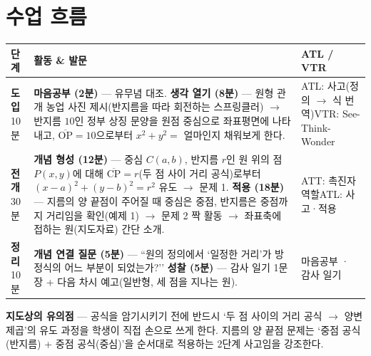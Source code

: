 \documentclass[11pt,a4paper]{article}
\begin{document}
\section{수업 흐름}
\begin{tabularx}{\linewidth}{@{}>{\centering\arraybackslash}p{1.6cm}X>{\raggedright\arraybackslash\small}p{3.1cm}@{}}
\toprule
\textbf{단계} & \textbf{활동 \& 발문} & \textbf{ATL / VTR} \\
\midrule
\textcolor{goldstrong}{\textbf{도입}}\newline\footnotesize 10분 &
\textbf{마음공부 (2분)} --- 유무념 대조.\newline
\textbf{생각 열기 (8분)} --- 원형 관개 농업 사진 제시(반지름을 따라 회전하는 스프링클러) $\to$ 반지름 $10$인 정부 상징 문양을 원점 중심으로 좌표평면에 나타내고, $\overline{\text{OP}}=10$으로부터 $x^2+y^2=$ 얼마인지 채워보게 한다. &
ATL: 사고(정의 $\to$ 식 번역)\newline VTR: See-Think-Wonder \\
\addlinespace
\textcolor{goldstrong}{\textbf{전개}}\newline\footnotesize 30분 &
\textbf{개념 형성 (12분)} --- 중심 $C(a,b)$, 반지름 $r$인 원 위의 점 $P(x,y)$에 대해 $\overline{\text{CP}}=r$(두 점 사이 거리 공식)로부터 $(x-a)^2+(y-b)^2=r^2$ 유도 $\to$ 문제 1.\newline
\textbf{적용 (18분)} --- 지름의 양 끝점이 주어질 때 중심은 중점, 반지름은 중점까지 거리임을 확인(예제 1) $\to$ 문제 2 짝 활동 $\to$ 좌표축에 접하는 원(지도자료) 간단 소개. &
ATT: 촉진자 역할\newline ATL: 사고·적용 \\
\addlinespace
\textcolor{goldstrong}{\textbf{정리}}\newline\footnotesize 10분 &
\textbf{개념 연결 질문 (5분)} --- ``원의 정의에서 `일정한 거리'가 방정식의 어느 부분이 되었는가?''\newline
\textbf{성찰 (5분)} --- 감사 일기 1문장 + 다음 차시 예고(일반형, 세 점을 지나는 원). &
마음공부 · 감사 일기 \\
\bottomrule
\end{tabularx}

\begin{calloutbox}
\textbf{지도상의 유의점} --- 공식을 암기시키기 전에 반드시 `두 점 사이의 거리 공식 $\to$ 양변 제곱'의 유도 과정을 학생이 직접 손으로 쓰게 한다. 지름의 양 끝점 문제는 `중점 공식(반지름) + 중점 공식(중심)'을 순서대로 적용하는 2단계 사고임을 강조한다.
\end{calloutbox}
\end{document}
